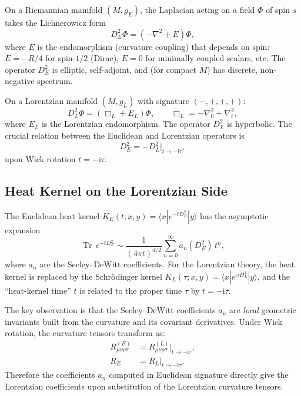 \documentclass[11pt,a4paper]{article}
\theoremstyle{definition}
\theoremstyle{remark}
\newcommand{\Tr}{\operatorname{Tr}}
\newcommand{\ii}{\mathrm{i}}
\begin{document}
On a Riemannian manifold $(M, g_E)$, the Laplacian acting on a field
$\Phi$ of spin $s$ takes the Lichnerowicz form
\begin{equation}
  \label{eq:D2E}
  D^2_E \Phi = (-\nabla^2 + E)\Phi,
\end{equation}
where $E$ is the endomorphism (curvature coupling) that depends on
spin: $E = -R/4$ for spin-$1/2$ (Dirac), $E = 0$ for minimally coupled
scalars, etc.  The operator $D^2_E$ is elliptic, self-adjoint, and
(for compact $M$) has discrete, non-negative spectrum.

On a Lorentzian manifold $(M, g_L)$ with signature $(-,+,+,+)$:
\begin{equation}
  \label{eq:D2L}
  D^2_L \Phi = (\Box_L + E_L)\Phi,
  \qquad \Box_L = -\nabla_0^2 + \nabla_i^2,
\end{equation}
where $E_L$ is the Lorentzian endomorphism.  The operator $D^2_L$ is
hyperbolic.  The crucial relation between the Euclidean and Lorentzian
operators is
\begin{equation}
  \label{eq:wick-D2}
  D^2_E = -D^2_L \big|_{t \to -\ii\tau},
\end{equation}
upon Wick rotation $t = -\ii\tau$.

\subsection{Heat Kernel on the Lorentzian Side}

The Euclidean heat kernel $K_E(t; x, y) = \langle x | e^{-t D^2_E} |
y \rangle$ has the asymptotic expansion
\begin{equation}
  \label{eq:hk-expansion}
  \Tr\, e^{-t D^2_E} \sim \frac{1}{(4\pi t)^{d/2}}
  \sum_{n=0}^{\infty} a_n(D^2_E)\, t^n,
\end{equation}
where $a_n$ are the Seeley--DeWitt coefficients.  For the Lorentzian
theory, the heat kernel is replaced by the Schr\"odinger kernel
$K_L(\tau; x, y) = \langle x | e^{\ii\tau D^2_L} | y \rangle$, and
the ``heat-kernel time'' $t$ is related to the proper time $\tau$ by
$t = -\ii\tau$.

The key observation is that the Seeley--DeWitt coefficients $a_n$ are
\emph{local} geometric invariants built from the curvature and its
covariant derivatives.  Under Wick rotation, the curvature tensors
transform as:
\begin{align}
  R_{\mu\nu\rho\sigma}^{(E)} &= R_{\mu\nu\rho\sigma}^{(L)}
  \big|_{t\to-\ii\tau},\\
  R_E &= R_L \big|_{t\to-\ii\tau}.
\end{align}
Therefore the coefficients $a_n$ computed in Euclidean signature
directly give the Lorentzian coefficients upon substitution of the
Lorentzian curvature tensors.
\end{document}
